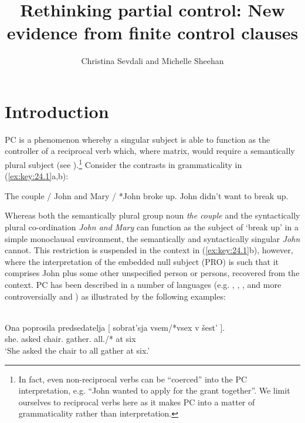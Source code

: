 \documentclass[output=paper]{langsci/langscibook}
\author{Christina Sevdali\affiliation{Ulster University} and Michelle Sheehan\affiliation{Anglia Ruskin University}}
\title{Rethinking partial control: New evidence from finite control clauses}
\begin{document}
\glsresetall
\maketitle

\section{Introduction}\label{sec:key:24.1}

\Gls{PC} is a
phenomenon whereby a singular subject is able to function as the controller of
a reciprocal verb which, where matrix, would require a semantically plural
subject (see \citealt{Landau2000}).\footnote{In fact, even non-reciprocal verbs
    can be “coerced” into the \gls{PC}
    interpretation, e.g. “John wanted to apply for the grant together”. We limit
    ourselves to reciprocal verbs here as it makes \gls{PC} into a matter of grammaticality rather than interpretation.} Consider
the contrasts in grammaticality in (\ref{ex:key:24.1}a,b):\largerpage[1]

\ea\label{ex:key:24.1}
	\ea The couple / John and Mary / *John broke up.
	\ex John didn’t want to break up.
	\z
\z

Whereas both the semantically plural group noun \emph{the couple} and the
syntactically plural co-ordination \emph{John and Mary} can function as the
subject of ‘break up’ in a simple monoclausal environment, the semantically and
syntactically singular \emph{John} cannot. This restriction is suspended in
the  context in (\ref{ex:key:24.1}b), however, where the interpretation of the embedded
null subject (PRO) is such that it comprises John plus some other unspecified
person or persons, recovered from the context. \gls{PC} has been described in a number of languages (e.g. ,
, ,  and more
controversially  and ) as
illustrated by the following examples:

\ea\label{ex:key:24.2}  \parencite[909]{Landau2008}\\
	\gll    Ona   poprosila   predsedatelja [ sobrat’sja   vsem/*vsex   v šest’ ].\\
    she.\Nom{}   asked  chair.\Acc{} {} gather.\Inf{}   all.\Dat{}/*\Acc{}  at six\\
	\glt    ‘She asked the chair to all gather at six.’
\z
\end{document}

